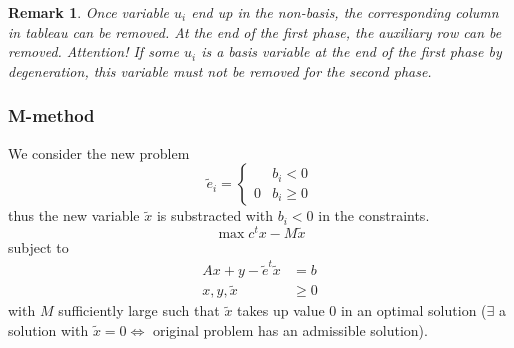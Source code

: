 \documentclass[a4paper]{article}
\numberwithin{lecref}{subsection}
\newtheorem*{Remark}{Remark}
\begin{document}
\begin{Remark}
	Once variable $u_i$ end up in the non-basis, the corresponding column in tableau can be removed. At the end of the first phase, the auxiliary row can be removed. Attention! If some $u_i$ is a basis variable at the end of the first phase by degeneration, this variable must not be removed for the second phase.
\end{Remark}

\subsubsection{M-method}


We consider the new problem
\[ \tilde e_i = \begin{cases}  & b_i < 0 \\ 0 & b_i \geq 0 \end{cases} \]
thus the new variable $\tilde x$ is substracted with $b_i < 0$ in the constraints.
\[ \max c^t x - M \tilde x \]
subject to
\begin{align*}
	Ax + y - \tilde e^t \tilde x &= b \\
	x, y, \tilde x &\geq 0
\end{align*}
with $M$ sufficiently large such that $\tilde x$ takes up value 0 in an optimal solution ($\exists$ a solution with $\tilde x = 0 \iff$ original problem has an admissible solution).
\end{document}
